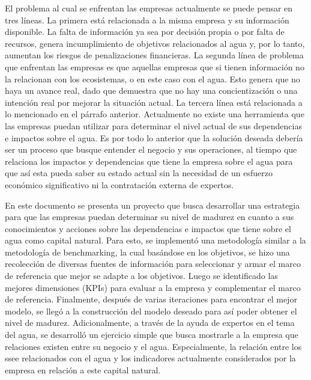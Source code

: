 El problema al cual se enfrentan las empresas actualmente se puede pensar en tres líneas. La primera está relacionada a la misma empresa y su información disponible. La falta de información ya sea por decisión propia o por falta de recursos, genera incumplimiento de objetivos relacionados al agua y, por lo tanto, aumentan los riesgos de penalizaciones financieras. La segunda línea de problema que enfrentan las empresas es que aquellas empresas que si tienen información no la relacionan con los ecosistemas, o en este caso con el agua. Esto genera que no haya un avance real, dado que demuestra que no hay una concientización o una intención real por mejorar la situación actual. La tercera línea está relacionada a lo mencionado en el párrafo anterior. Actualmente no existe una herramienta que las empresas puedan utilizar para determinar el nivel actual de sus dependencias e impactos sobre el agua. Es por todo lo anterior que la solución deseada debería ser un proceso que busque entender el negocio y sus operaciones, al tiempo que relaciona los impactos y dependencias que tiene la empresa sobre el agua para que así esta pueda saber su estado actual sin la necesidad de un esfuerzo económico significativo ni la contratación externa de expertos.

\hfill

En este documento se presenta un proyecto que busca desarrollar una estrategia para que las empresas puedan determinar su nivel de madurez en cuanto a sus conocimientos y acciones sobre las dependencias e impactos que tiene sobre el agua como capital natural. Para esto, se implementó una metodología similar a la metodología de benchmarking, la cual basándose en los objetivos, se hizo una recolección de diversas fuentes de información para seleccionar y armar el marco de referencia que mejor se adapte a los objetivos. Luego se identificado las mejores dimensiones (KPIs) para evaluar a la empresa y complementar el marco de referencia. Finalmente, después de varias iteraciones para encontrar el mejor modelo, se llegó a la construcción del modelo deseado para así poder obtener el nivel de madurez.  Adicionalmente, a través de la ayuda de expertos en el tema del agua, se desarrolló un ejercicio simple que busca mostrarle a la empresa que relaciones existen entre su negocio y el agua. Especialmente, la relación entre los \acrfull{ssee} relacionados con el agua y los indicadores actualmente considerados por la empresa en relación a este capital natural. 

\hfill


